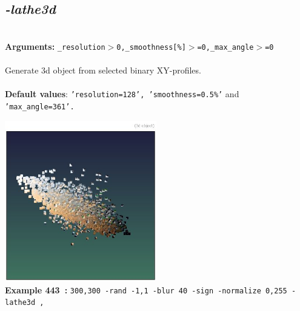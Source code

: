 \documentclass[a4paper,11pt,twoside]{book}
\begin{document}
\subsection{\emph{-lathe3d} }\vspace*{-0.5em}
~\\\textbf{Arguments: } 
{\small \texttt{\_resolution$>$0,\_smoothness[\%]$>$=0,\_max\_angle$>$=0}}\\~\\
Generate 3d object from selected binary XY-profiles.
~\\~\\\textbf{Default values}: {\small \texttt{'resolution=128', 'smoothness=0.5\%'} and \texttt{'max\_angle=361'.}}
\begin{center}\includegraphics[keepaspectratio=true,height=7cm,width=\textwidth]{img/gmic_def443.jpg}\\
{\footnotesize \textbf{Example 443~:} \texttt{300,300 -rand -1,1 -blur 40 -sign -normalize 0,255 -lathe3d ,}}
\end{center}
\end{document}

